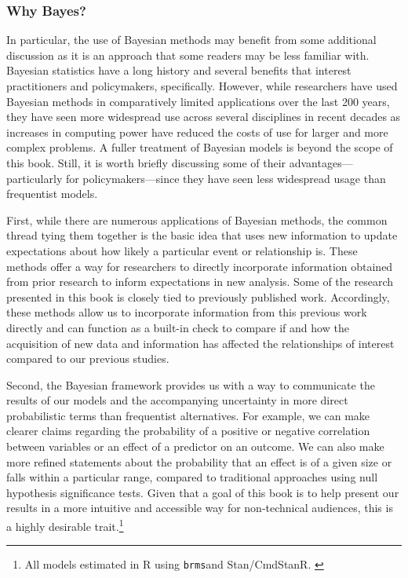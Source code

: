 \subsubsection*{Why Bayes?}

In particular, the use of Bayesian methods may benefit from some additional discussion as it is an approach that some readers may be less familiar with. Bayesian statistics have a long history and several benefits that interest practitioners and policymakers, specifically. However, while researchers have used Bayesian methods in comparatively limited applications over the last 200 years, they have seen more widespread use across several disciplines in recent decades as increases in computing power have reduced the costs of use for larger and more complex problems.\cite[For a fuller review of the history of Bayes' Rule and Bayesian statistics see:][]{mcgrayne2012} A fuller treatment of Bayesian models is beyond the scope of this book. Still, it is worth briefly discussing some of their advantages---particularly for policymakers---since they have seen less widespread usage than frequentist models. 

First, while there are numerous applications of Bayesian methods, the common thread tying them together is the basic idea that uses new information to update expectations about how likely a particular event or relationship is. These methods offer a way for researchers to directly incorporate information obtained from prior research to inform expectations in new analysis. Some of the research presented in this book is closely tied to previously published work.\cite{Allen2020} Accordingly, these methods allow us to incorporate information from this previous work directly and can function as a built-in check to compare if and how the acquisition of new data and information has affected the relationships of interest compared to our previous studies.

Second, the Bayesian framework provides us with a way to communicate the results of our models and the accompanying uncertainty in more direct probabilistic terms than frequentist alternatives. For example, we can make clearer claims regarding the probability of a positive or negative correlation between variables or an effect of a predictor on an outcome. We can also make more refined statements about the probability that an effect is of a given size or falls within a particular range, compared to traditional approaches using null hypothesis significance tests. Given that a goal of this book is to help present our results in a more intuitive and accessible way for non-technical audiences, this is a highly desirable trait.\footnote{All models estimated in R using {\tt brms}and Stan/CmdStanR. \cite{stan2021,cmdstanr2021,burkner2017}} 

